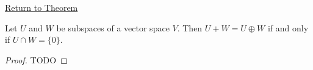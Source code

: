 \newpage
{}
\label{prf:direct-sum-of-two-subspaces}

\begin{remark*}[Return]
\hyperref[thm:direct-sum-of-two-subspaces]{Return to Theorem}
\end{remark*}

\begin{theorem*}
Let $U$ and $W$ be subspaces of a vector space $V$.
Then $U+W = U\oplus W$ if and only if $U \cap W = \{0\}$.
\end{theorem*}

\begin{proof}
TODO
\end{proof}
